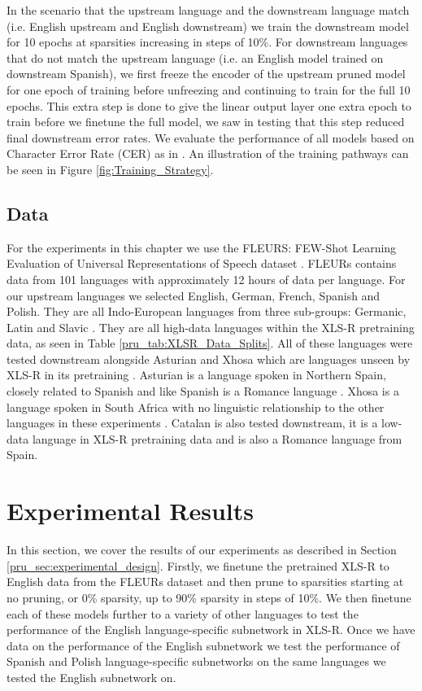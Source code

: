 In the scenario that the upstream language and the downstream language match (i.e. English upstream and English downstream) we train the downstream model for 10 epochs at sparsities increasing in steps of 10\%. For downstream languages that do not match the upstream language (i.e. an English model trained on downstream Spanish), we first freeze the encoder of the upstream pruned model for one epoch of training before unfreezing and continuing to train for the full 10 epochs. This extra step is done to give the linear output layer one extra epoch to train before we finetune the full model, we saw in testing that this step reduced final downstream error rates. We evaluate the performance of all models based on Character Error Rate (CER) as in \cite{FLEURS_XLSR_WHISPER}. An illustration of the training pathways can be seen in Figure \ref{fig:Training_Strategy}.

\subsection{Data}
For the experiments in this chapter we use the FLEURS: FEW-Shot Learning Evaluation of Universal Representations of Speech dataset \cite{FLEURS}. FLEURs contains data from 101 languages with approximately 12 hours of data per language. For our upstream languages we selected English, German, French, Spanish and Polish. They are all Indo-European languages from three sub-groups: Germanic, Latin and Slavic \cite{bauer2007linguistics}. They are all high-data languages within the XLS-R pretraining data, as seen in Table \ref{pru_tab:XLSR_Data_Splits}. All of these languages were tested downstream alongside Asturian and Xhosa which are languages unseen by XLS-R in its pretraining \cite{babu2021xlsr}. Asturian is a language spoken in Northern Spain, closely related to Spanish and like Spanish is a Romance language \cite{Asturian_Muñiz-Cachón_2018}. Xhosa is a language spoken in South Africa with no linguistic relationship to the other languages in these experiments \cite{bauer2007linguistics}. Catalan is also tested downstream, it is a low-data language in XLS-R pretraining data and is also a Romance language from Spain.


\clearpage
\section{Experimental Results} \label{pru_sec:experimental_results}
In this section, we cover the results of our experiments as described in Section \ref{pru_sec:experimental_design}. Firstly, we finetune the pretrained XLS-R \cite{babu2021xlsr} to English data from the FLEURs dataset \cite{FLEURS} and then prune to sparsities starting at no pruning, or 0\% sparsity, up to 90\% sparsity in steps of 10\%. We then finetune each of these models further to a variety of other languages to test the performance of the English language-specific subnetwork in XLS-R. Once we have data on the performance of the English subnetwork we test the performance of Spanish and Polish language-specific subnetworks on the same languages we tested the English subnetwork on.

